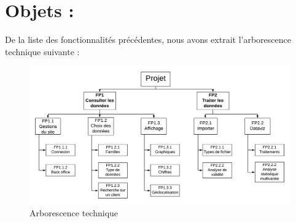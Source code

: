 \section{Objets :}

De la liste des fonctionnalités précédentes, nous avons extrait l'arborescence technique suivante :
\begin{figure}[h]
	\begin{center}
		\includegraphics[scale=0.6]{img/ArborescenceTechnique.png}
		\caption{Arborescence technique}
	\end{center}
\end{figure}

